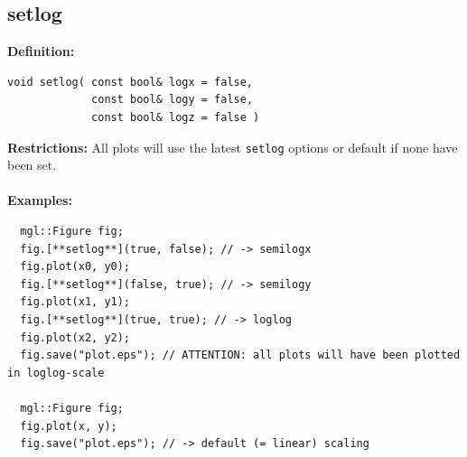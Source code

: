 \documentclass[a4paper]{article}
\newcommand{\command}[1]{\subsection{#1}}
\begin{document}
\command{setlog}

\textbf{Definition:}
\begin{lstlisting}
void setlog( const bool& logx = false, 
             const bool& logy = false,
             const bool& logz = false )
\end{lstlisting}
%
\textbf{Restrictions:} All plots will use the latest \texttt{setlog} options or default if none have been set. \\ \\
%
\textbf{Examples:}
\begin{lstlisting}
  mgl::Figure fig;
  fig.[**setlog**](true, false); // -> semilogx
  fig.plot(x0, y0); 
  fig.[**setlog**](false, true); // -> semilogy
  fig.plot(x1, y1);
  fig.[**setlog**](true, true); // -> loglog
  fig.plot(x2, y2);
  fig.save("plot.eps"); // ATTENTION: all plots will have been plotted in loglog-scale 

  mgl::Figure fig;
  fig.plot(x, y);
  fig.save("plot.eps"); // -> default (= linear) scaling
\end{lstlisting}
\end{document}
